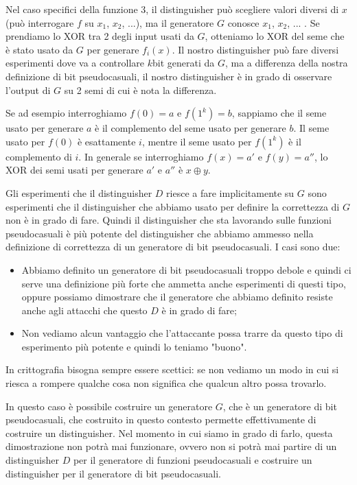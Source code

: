 \begin{enumerate}
    Nel caso specifici della funzione 3, il distinguisher può scegliere valori diversi di $x$ (può interrogare $f$ su $x_1$, $x_2$, ...), ma il generatore $G$ conosce $x_1$, $x_2$, ... . Se prendiamo lo XOR tra 2 degli input usati da $G$, otteniamo lo XOR del seme che è stato usato da $G$ per generare $f_i(x)$. Il nostro distinguisher può fare diversi esperimenti dove va a controllare $k$bit generati da $G$, ma a differenza della nostra definizione di bit pseudocasuali, il nostro distinguisher è in grado di osservare l'output di $G$ su 2 semi di cui è nota la differenza.

    Se ad esempio interroghiamo $f(0) = a$ e $f(1^k) = b$, sappiamo che il seme usato per generare $a$ è il complemento del seme usato per generare $b$. Il seme usato per $f(0)$ è esattamente $i$, mentre il seme usato per $f(1^k)$ è il complemento di $i$. In generale se interroghiamo $f(x) = a'$ e $f(y) = a''$, lo XOR dei semi usati per generare $a'$ e $a''$ è $x \oplus y$. 

    Gli esperimenti che il distinguisher $D$ riesce a fare implicitamente su $G$ sono esperimenti che il distinguisher che abbiamo usato per definire la correttezza di $G$ non è in grado di fare. Quindi il distinguisher che sta lavorando sulle funzioni pseudocasuali è più potente del distinguisher che abbiamo ammesso nella definizione di correttezza di un generatore di bit pseudocasuali. I casi sono due:
    \begin{itemize}
        \item Abbiamo definito un generatore di bit pseudocasuali troppo debole e quindi ci serve una definizione più forte che ammetta anche esperimenti di questi tipo, oppure possiamo dimostrare che il generatore che abbiamo definito resiste anche agli attacchi che questo $D$ è in grado di fare;
        \item  Non vediamo alcun vantaggio che l'attaccante possa trarre da questo tipo di esperimento più potente e quindi lo teniamo "buono".
    \end{itemize}

    In crittografia bisogna sempre essere scettici: se non vediamo un modo  in cui si riesca a rompere qualche cosa non significa che qualcun altro possa trovarlo. 

    In questo caso è possibile costruire un generatore $G$, che è un generatore di bit pseudocasuali, che costruito in questo contesto permette effettivamente di costruire un distinguisher. Nel momento in cui siamo in grado di farlo, questa dimostrazione non potrà mai funzionare, ovvero non si potrà mai partire di un distinguisher $D$ per il generatore di funzioni pseudocasuali e costruire un distinguisher per il generatore di bit pseudocasuali.


\end{enumerate}
